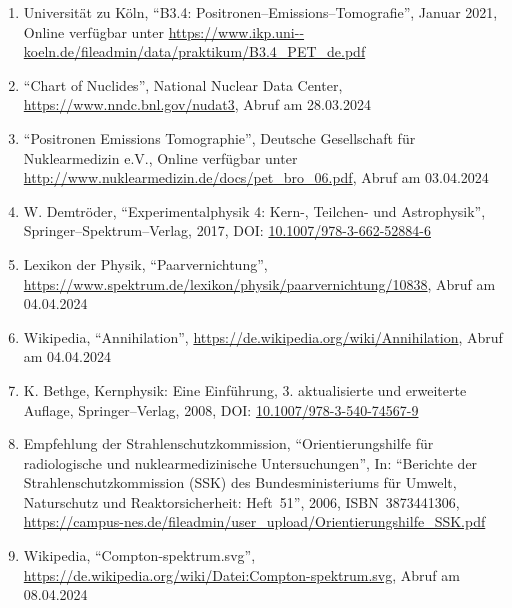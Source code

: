 \documentclass[12pt,a4paper]{scrartcl}
\numberwithin{equation}{section} %
\renewcommand{\[}{} %
\renewcommand{\]}{\noindent} %
\newcommand{\tightlist}{} %
\begin{document}
\begin{enumerate}
\def\labelenumi{\arabic{enumi}.}
\tightlist
\item
  Universität zu Köln, ``B3.4: Positronen--Emissions--Tomografie'',
  Januar 2021, Online verfügbar unter
  \url{https://www.ikp.uni--koeln.de/fileadmin/data/praktikum/B3.4\_PET\_de.pdf}
\item
  ``Chart of Nuclides'', National Nuclear Data Center,
  \url{https://www.nndc.bnl.gov/nudat3}, Abruf am 28.03.2024
\item
  ``Positronen Emissions Tomographie'', Deutsche Gesellschaft für
  Nuklearmedizin e.V., Online verfügbar unter
  \url{http://www.nuklearmedizin.de/docs/pet_bro_06.pdf}, Abruf am
  03.04.2024
\item
  W. Demtröder, ``Experimentalphysik 4: Kern-, Teilchen- und
  Astrophysik'', Springer--Spektrum--Verlag, 2017, DOI:
  \href{https://link.springer.com/book/10.1007/978-3-662-52884-6}{10.1007/978-3-662-52884-6}
\item
  Lexikon der Physik, ``Paarvernichtung'',
  \url{https://www.spektrum.de/lexikon/physik/paarvernichtung/10838},
  Abruf am 04.04.2024
\item
  Wikipedia, ``Annihilation'',
  \url{https://de.wikipedia.org/wiki/Annihilation}, Abruf am 04.04.2024
\item
  K. Bethge, Kernphysik: Eine Einführung, 3. aktualisierte und
  erweiterte Auflage, Springer--Verlag, 2008, DOI:
  \href{https://doi.org/10.1007/978-3-540-74567-9}{10.1007/978-3-540-74567-9}
\item
  Empfehlung der Strahlenschutzkommission, ``Orientierungshilfe für
  radiologische und nuklearmedizinische Untersuchungen'', In: ``Berichte
  der Strahlenschutzkommission (SSK) des Bundesministeriums für Umwelt,
  Naturschutz und Reaktorsicherheit: Heft~51'', 2006, ISBN~3873441306, \url{https://campus-nes.de/fileadmin/user\_upload/Orientierungshilfe\_SSK.pdf}
\item
	Wikipedia, ``Compton-spektrum.svg'', \url{https://de.wikipedia.org/wiki/Datei:Compton-spektrum.svg}, Abruf am 08.04.2024
\end{enumerate}
\end{document}
